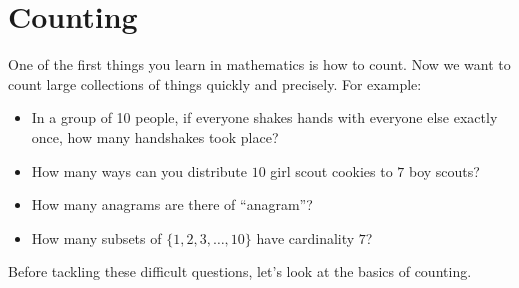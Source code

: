 \documentclass[10pt,]{book}
\theoremstyle{plain}
\theoremstyle{definition}
\theoremstyle{definition}
\theoremstyle{definition}
\numberwithin{equation}{section}
\begin{document}
\typeout{************************************************}
\typeout{************************************************}
\chapter[Counting]{Counting}\label{ch_counting}
\typeout{************************************************}
\typeout{************************************************}

One of the first things you learn in mathematics is how to count. Now we want to count large collections of things quickly and precisely. For example:
%
\leavevmode%
\begin{itemize}[label=\textbullet]
\item{}
In a group of 10 people, if everyone shakes hands with everyone else exactly once, how many handshakes took place?
%
\item{}
How many ways can you distribute \(10\) girl scout cookies to \(7\) boy scouts?
%
\item{}
How many anagrams are there of ``anagram''?
%
\item{}
How many subsets of \(\{1,2,3,\ldots, 10\}\) have cardinality \(7\)?
%
\end{itemize}
\par

Before tackling these difficult questions, let's look at the basics of counting.
%
\typeout{************************************************}
\typeout{************************************************}
\end{document}
